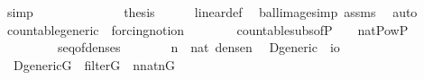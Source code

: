 \begin{isabellebody}
\ simp\isanewline
\ \ \ \ \isamarkupfalse%
\isanewline
\ \ \isacommand{{\isacharbraceright}{\kern0pt}}\isamarkupfalse%
\isanewline
\ \ \isamarkupfalse%
\isanewline
\ \ \isamarkupfalse%
\ {\isacharquery}{\kern0pt}thesis\isanewline
\ \ \ \ \isamarkupfalse%
\ linear{\isacharunderscore}{\kern0pt}def\ \isamarkupfalse%
\ ball{\isacharunderscore}{\kern0pt}image{\isacharunderscore}{\kern0pt}simp\ assms\ \isamarkupfalse%
\ auto\isanewline
{}\isamarkupfalse%
%
\endisatagproof
{\isafoldproof}%
%
\isadelimproof
\isanewline
%
\endisadelimproof
\isanewline
{}\isamarkupfalse%
%
\isadelimdocument
%
\endisadelimdocument
%
\isatagdocument
%
\isamarkuptrue%
%
\endisatagdocument
{\isafolddocument}%
%
\isadelimdocument
%
\endisadelimdocument
{}\isamarkupfalse%
\ countable{\isacharunderscore}{\kern0pt}generic\ {\isacharequal}{\kern0pt}\ forcing{\isacharunderscore}{\kern0pt}notion\ {\isacharplus}{\kern0pt}\isanewline
\ \ \ {\isasymD}\isanewline
\ \ \ countable{\isacharunderscore}{\kern0pt}subs{\isacharunderscore}{\kern0pt}of{\isacharunderscore}{\kern0pt}P{\isacharcolon}{\kern0pt}\ \ {\isachardoublequoteopen}{\isasymD}\ {\isasymin}\ nat{\isasymrightarrow}Pow{\isacharparenleft}{\kern0pt}P{\isacharparenright}{\kern0pt}{\isachardoublequoteclose}\isanewline
\ \ \ \ \ \ \ \ \ seq{\isacharunderscore}{\kern0pt}of{\isacharunderscore}{\kern0pt}denses{\isacharcolon}{\kern0pt}\ \ \ \ \ \ \ \ {\isachardoublequoteopen}{\isasymforall}n\ {\isasymin}\ nat{\isachardot}{\kern0pt}\ dense{\isacharparenleft}{\kern0pt}{\isasymD}{\isacharbackquote}{\kern0pt}n{\isacharparenright}{\kern0pt}{\isachardoublequoteclose}\isanewline
\isanewline
{}\isanewline
\isanewline
{}\isamarkupfalse%
\isanewline
\ \ D{\isacharunderscore}{\kern0pt}generic\ {\isacharcolon}{\kern0pt}{\isacharcolon}{\kern0pt}\ {\isachardoublequoteopen}i{\isasymRightarrow}o{\isachardoublequoteclose}\ \isanewline
\ \ {\isachardoublequoteopen}D{\isacharunderscore}{\kern0pt}generic{\isacharparenleft}{\kern0pt}G{\isacharparenright}{\kern0pt}\ {\isasymequiv}\ filter{\isacharparenleft}{\kern0pt}G{\isacharparenright}{\kern0pt}\ {\isasymand}\ {\isacharparenleft}{\kern0pt}{\isasymforall}n{\isasymin}nat{\isachardot}{\kern0pt}{\isacharparenleft}{\kern0pt}{\isasymD}{\isacharbackquote}{\kern0pt}n{\isacharparenright}{\kern0pt}{\isasyminter}G{\isasymnoteq}{}{\isacharparenright}{\kern0pt}{\isachardoublequoteclose}%

\end{isabellebody}
